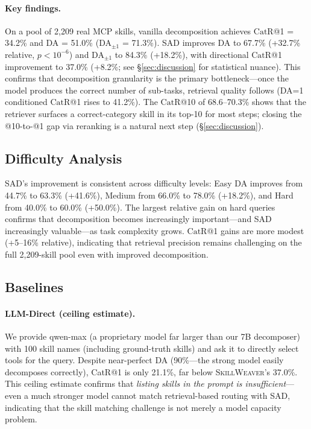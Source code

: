 \documentclass[11pt]{article}
\newcommand{\system}{\textsc{SkillWeaver}}
\newcommand{\catrecall}{\text{CatR}}
\begin{document}
\paragraph{Key findings.}
On a pool of 2{,}209 real MCP skills, vanilla decomposition achieves $\catrecall$@1 = 34.2\% and DA = 51.0\% (DA$_{\pm 1}$ = 71.3\%).
SAD improves DA to 67.7\% (+32.7\% relative, $p < 10^{-6}$) and DA$_{\pm 1}$ to 84.3\% (+18.2\%), with directional $\catrecall$@1 improvement to 37.0\% (+8.2\%; see \S\ref{sec:discussion} for statistical nuance).
This confirms that decomposition granularity is the primary bottleneck---once the model produces the correct number of sub-tasks, retrieval quality follows (DA=1 conditioned $\catrecall$@1 rises to 41.2\%).
The $\catrecall$@10 of 68.6--70.3\% shows that the retriever surfaces a correct-category skill in its top-10 for most steps; closing the @10-to-@1 gap via reranking is a natural next step (\S\ref{sec:discussion}).

\subsection{Difficulty Analysis}

SAD's improvement is consistent across difficulty levels: Easy DA improves from 44.7\% to 63.3\% (+41.6\%), Medium from 66.0\% to 78.0\% (+18.2\%), and Hard from 40.0\% to 60.0\% (+50.0\%).
The largest relative gain on hard queries confirms that decomposition becomes increasingly important---and SAD increasingly valuable---as task complexity grows.
$\catrecall$@1 gains are more modest (+5--16\% relative), indicating that retrieval precision remains challenging on the full 2{,}209-skill pool even with improved decomposition.

\subsection{Baselines}

\paragraph{LLM-Direct (ceiling estimate).}
We provide qwen-max (a proprietary model far larger than our 7B decomposer) with 100 skill names (including ground-truth skills) and ask it to directly select tools for the query.
Despite near-perfect DA (90\%---the strong model easily decomposes correctly), CatR@1 is only 21.1\%, far below \system{}'s 37.0\%.
This ceiling estimate confirms that \emph{listing skills in the prompt is insufficient}---even a much stronger model cannot match retrieval-based routing with SAD, indicating that the skill matching challenge is not merely a model capacity problem.
\end{document}
